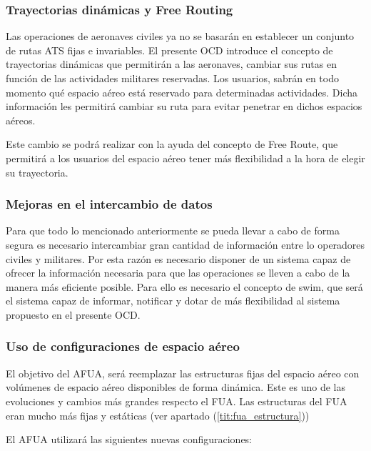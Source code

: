 \subsubsection{Trayectorias dinámicas y Free Routing}

Las operaciones de aeronaves civiles ya no se basarán en establecer un conjunto de rutas ATS fijas e invariables. El presente OCD introduce el concepto de trayectorias dinámicas que permitirán a las aeronaves, cambiar sus rutas en función de las actividades militares reservadas.  Los usuarios, sabrán en todo momento qué espacio aéreo está reservado para determinadas actividades. Dicha información les permitirá cambiar su ruta para evitar penetrar en dichos espacios aéreos. 

Este cambio se podrá realizar con la ayuda del concepto de Free Route, que permitirá a los usuarios del espacio aéreo tener más flexibilidad a la hora de elegir su trayectoria. 

\subsubsection{Mejoras en el intercambio de datos}

Para que todo lo mencionado anteriormente se pueda llevar a cabo de forma segura es necesario intercambiar gran cantidad de información entre lo operadores civiles y militares. Por esta razón es necesario disponer de un sistema capaz de ofrecer la información necesaria para que las operaciones se lleven a cabo de la manera más eficiente posible. Para ello es necesario el concepto de \acrfull{swim}, que será el sistema capaz de informar, notificar y dotar de más flexibilidad al sistema propuesto en el presente OCD.

\subsubsection{Uso de configuraciones de espacio aéreo}

El objetivo del AFUA, será reemplazar las estructuras fijas del espacio aéreo con volúmenes de espacio aéreo disponibles de forma dinámica. Este es uno de las evoluciones y cambios más grandes respecto el FUA. Las estructuras del FUA eran mucho más fijas y estáticas (ver apartado (\ref{tit:fua_estructura})) 

El AFUA utilizará las siguientes nuevas configuraciones:

